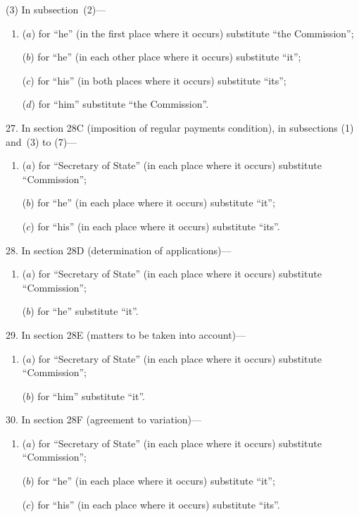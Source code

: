 \documentclass[12pt,a4paper]{article}
\begin{document}
(3) In subsection~(2)—
\begin{enumerate}\item[]
($a$) for “he” (in the first place where it occurs) substitute “the Commission”;

($b$) for “he” (in each other place where it occurs) substitute “it”;

($c$) for “his” (in both places where it occurs) substitute “its”;

($d$) for “him” substitute “the Commission”.
\end{enumerate}

\medskip

27. In section 28C (imposition of regular payments condition), in subsections (1) and~(3) to (7)—
\begin{enumerate}\item[]
($a$) for “Secretary of State” (in each place where it occurs) substitute “Commission”;

($b$) for “he” (in each place where it occurs) substitute “it”;

($c$) for “his” (in each place where it occurs) substitute “its”.
\end{enumerate}

\medskip

28. In section 28D (determination of applications)—
\begin{enumerate}\item[]
($a$) for “Secretary of State” (in each place where it occurs) substitute “Commission”;

($b$) for “he” substitute “it”.
\end{enumerate}

\medskip

29. In section 28E (matters to be taken into account)—
\begin{enumerate}\item[]
($a$) for “Secretary of State” (in each place where it occurs) substitute “Commission”;

($b$) for “him” substitute “it”.
\end{enumerate}

\medskip

30. In section 28F (agreement to variation)—
\begin{enumerate}\item[]
($a$) for “Secretary of State” (in each place where it occurs) substitute “Commission”;

($b$) for “he” (in each place where it occurs) substitute “it”;

($c$) for “his” (in each place where it occurs) substitute “its”.
\end{enumerate}
\end{document}
